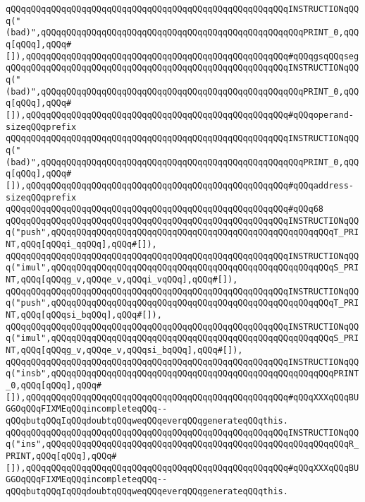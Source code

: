 \verb|qQQqqQQqqQQqqQQqqQQqqQQqqQQqqQQqqQQqqQQqqQQqqQQqqQQqqQQqINSTRUCTIONqQQq("(bad)",qQQqqQQqqQQqqQQqqQQqqQQqqQQqqQQqqQQqqQQqqQQqqQQqqQQqPRINT_0,qQQq[qQQq],qQQq#[]),qQQqqQQqqQQqqQQqqQQqqQQqqQQqqQQqqQQqqQQqqQQqqQQqqQQq#qQQqgsqQQqseg|\newline
\verb|qQQqqQQqqQQqqQQqqQQqqQQqqQQqqQQqqQQqqQQqqQQqqQQqqQQqqQQqINSTRUCTIONqQQq("(bad)",qQQqqQQqqQQqqQQqqQQqqQQqqQQqqQQqqQQqqQQqqQQqqQQqqQQqPRINT_0,qQQq[qQQq],qQQq#[]),qQQqqQQqqQQqqQQqqQQqqQQqqQQqqQQqqQQqqQQqqQQqqQQqqQQq#qQQqoperand-sizeqQQqprefix|\newline
\verb|qQQqqQQqqQQqqQQqqQQqqQQqqQQqqQQqqQQqqQQqqQQqqQQqqQQqqQQqINSTRUCTIONqQQq("(bad)",qQQqqQQqqQQqqQQqqQQqqQQqqQQqqQQqqQQqqQQqqQQqqQQqqQQqPRINT_0,qQQq[qQQq],qQQq#[]),qQQqqQQqqQQqqQQqqQQqqQQqqQQqqQQqqQQqqQQqqQQqqQQqqQQq#qQQqaddress-sizeqQQqprefix|\newline
\verb|qQQqqQQqqQQqqQQqqQQqqQQqqQQqqQQqqQQqqQQqqQQqqQQqqQQqqQQq#qQQq68|\newline
\verb|qQQqqQQqqQQqqQQqqQQqqQQqqQQqqQQqqQQqqQQqqQQqqQQqqQQqqQQqINSTRUCTIONqQQq("push",qQQqqQQqqQQqqQQqqQQqqQQqqQQqqQQqqQQqqQQqqQQqqQQqqQQqqQQqT_PRINT,qQQq[qQQqi_qqQQq],qQQq#[]),|\newline
\verb|qQQqqQQqqQQqqQQqqQQqqQQqqQQqqQQqqQQqqQQqqQQqqQQqqQQqqQQqINSTRUCTIONqQQq("imul",qQQqqQQqqQQqqQQqqQQqqQQqqQQqqQQqqQQqqQQqqQQqqQQqqQQqqQQqS_PRINT,qQQq[qQQqg_v,qQQqe_v,qQQqi_vqQQq],qQQq#[]),|\newline
\verb|qQQqqQQqqQQqqQQqqQQqqQQqqQQqqQQqqQQqqQQqqQQqqQQqqQQqqQQqINSTRUCTIONqQQq("push",qQQqqQQqqQQqqQQqqQQqqQQqqQQqqQQqqQQqqQQqqQQqqQQqqQQqqQQqT_PRINT,qQQq[qQQqsi_bqQQq],qQQq#[]),|\newline
\verb|qQQqqQQqqQQqqQQqqQQqqQQqqQQqqQQqqQQqqQQqqQQqqQQqqQQqqQQqINSTRUCTIONqQQq("imul",qQQqqQQqqQQqqQQqqQQqqQQqqQQqqQQqqQQqqQQqqQQqqQQqqQQqqQQqS_PRINT,qQQq[qQQqg_v,qQQqe_v,qQQqsi_bqQQq],qQQq#[]),|\newline
\verb|qQQqqQQqqQQqqQQqqQQqqQQqqQQqqQQqqQQqqQQqqQQqqQQqqQQqqQQqINSTRUCTIONqQQq("insb",qQQqqQQqqQQqqQQqqQQqqQQqqQQqqQQqqQQqqQQqqQQqqQQqqQQqqQQqPRINT_0,qQQq[qQQq],qQQq#[]),qQQqqQQqqQQqqQQqqQQqqQQqqQQqqQQqqQQqqQQqqQQqqQQqqQQq#qQQqXXXqQQqBUGGOqQQqFIXMEqQQqincompleteqQQq--qQQqbutqQQqIqQQqdoubtqQQqweqQQqeverqQQqgenerateqQQqthis.|\newline
\verb|qQQqqQQqqQQqqQQqqQQqqQQqqQQqqQQqqQQqqQQqqQQqqQQqqQQqqQQqINSTRUCTIONqQQq("ins",qQQqqQQqqQQqqQQqqQQqqQQqqQQqqQQqqQQqqQQqqQQqqQQqqQQqqQQqqQQqR_PRINT,qQQq[qQQq],qQQq#[]),qQQqqQQqqQQqqQQqqQQqqQQqqQQqqQQqqQQqqQQqqQQqqQQqqQQq#qQQqXXXqQQqBUGGOqQQqFIXMEqQQqincompleteqQQq--qQQqbutqQQqIqQQqdoubtqQQqweqQQqeverqQQqgenerateqQQqthis.|\newline
